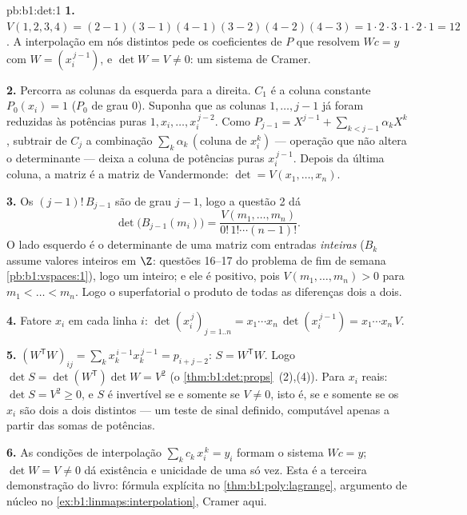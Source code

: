 \begin{solution}{pb:b1:det:1}
\textbf{1.} $V(1,2,3,4) = (2-1)(3-1)(4-1)(3-2)(4-2)(4-3) = 1
\cdot 2\cdot 3\cdot 1\cdot 2\cdot 1 = 12$. A interpolação em nós distintos pede os
coeficientes de $P$ que resolvem $W c = y$ com $W = (x_i^{\,j-1})$, e $\det W = V \neq 0$: um
sistema de Cramer.

\textbf{2.} Percorra as colunas da esquerda para a direita. $C_1$ é
a coluna constante $P_0(x_i) = 1$ ($P_0$  de grau $0$). Suponha que as
colunas $1, \dots, j-1$ já foram reduzidas às potências puras $1, x_i, \dots, x_i^{\,j-2}$. Como
$P_{j-1}
= X^{j-1} + \sum_{k < j-1}\alpha_k X^k$, subtrair de $C_j$ a combinação $\sum_k \alpha_k\,(\text{coluna de } x_i^k)$ --- operação que não
altera o determinante --- deixa a coluna de potências puras $x_i^{\,j-1}$.
Depois da última coluna, a matriz é a matriz de Vandermonde: $\det = V(x_1, \dots, x_n)$.

\textbf{3.} Os  $(j-1)!\,B_{j-1}$ são  de grau $j - 1$, logo a
questão 2 dá
\[
\det\bigl(B_{j-1}(m_i)\bigr)
= \frac{V(m_1, \dots, m_n)}{0!\,1!\cdots(n-1)!} .
\]
O lado esquerdo é o determinante de uma matriz com entradas
\emph{inteiras} ($B_k$ assume valores inteiros em $\Z$: questões
16--17 do problema de fim de semana \cref{pb:b1:vspaces:1}), logo um inteiro; e ele é
positivo, pois $V(m_1, \dots, m_n) > 0$ para $m_1 <
\dots < m_n$. Logo o superfatorial  o
produto de todas as diferenças dois a dois.

\textbf{4.} Fatore $x_i$ em cada linha $i$: $\det(x_i^{\,j})_{j = 1..n} = x_1\cdots x_n\,
\det(x_i^{\,j-1}) = x_1\cdots x_n\,V$.

\textbf{5.} $(W^{\mathsf T}W)_{ij} = \sum_k x_k^{\,i-1}
x_k^{\,j-1} = p_{i+j-2}$: $S = W^{\mathsf T}W$. Logo $\det S =
\det(W^{\mathsf T})\det W = V^2$ (o \cref{thm:b1:det:props}~(2),(4)). Para $x_i$
reais: $\det S = V^2
\geq 0$, e $S$ é invertível se e somente se $V \neq 0$, isto é, se e
somente se os $x_i$ são dois a dois distintos --- um teste de sinal
definido, computável apenas a partir das somas de potências.

\textbf{6.} As condições de interpolação $\sum_{k}
c_k\,x_i^{\,k} = y_i$ formam o sistema
$Wc = y$; $\det W = V \neq
0$ dá existência e unicidade de uma só vez. Esta é a
terceira demonstração do livro: fórmula explícita no \cref{thm:b1:poly:lagrange},
argumento de núcleo no \cref{ex:b1:linmaps:interpolation}, Cramer aqui.


\end{solution}
